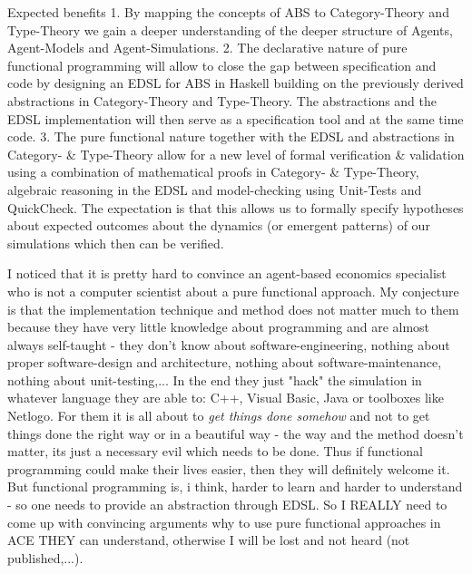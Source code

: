 Expected benefits
1. By mapping the concepts of ABS to Category-Theory and Type-Theory we gain a deeper understanding of the deeper structure of Agents, Agent-Models and Agent-Simulations.
2. The declarative nature of pure functional programming will allow to close the gap between specification and code by designing an EDSL for ABS in Haskell building on the previously derived abstractions in Category-Theory and Type-Theory. The abstractions and the EDSL implementation will then serve as a specification tool and at the same time code.
3. The pure functional nature together with the EDSL and abstractions in Category- \& Type-Theory allow for a new level of formal verification \& validation using a combination of mathematical proofs in Category- \& Type-Theory, algebraic reasoning in the EDSL and model-checking using Unit-Tests and QuickCheck. The expectation is that this allows us to formally specify hypotheses about expected outcomes about the dynamics (or emergent patterns) of our simulations which then can be verified.
	
	
	
	
	
	
	
	
	
	
	
	
I noticed that it is pretty hard to convince an agent-based economics specialist who is not a computer scientist about a pure functional approach. My conjecture is that the implementation technique and method does not matter much to them because they have very little knowledge about programming and are almost always self-taught - they don't know about software-engineering, nothing about proper software-design and architecture, nothing about software-maintenance, nothing about unit-testing,... In the end they just "hack" the simulation in whatever language they are able to: C++, Visual Basic, Java or toolboxes like Netlogo. For them it is all about to \textit{get things done somehow} and not to get things done the right way or in a beautiful way - the way and the method doesn't matter, its just a necessary evil which needs to be done. Thus if functional programming could make their lives easier, then they will definitely welcome it. But functional programming is, i think, harder to learn and harder to understand - so one needs to provide an abstraction through EDSL. So I REALLY need to come up with convincing arguments why to use pure functional approaches in ACE THEY can understand, otherwise I will be lost and not heard (not published,...). 

